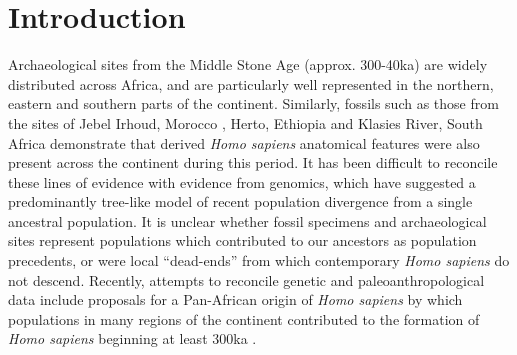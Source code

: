 \documentclass[]{article}
\begin{document}
\section*{Introduction}

Archaeological sites from the Middle Stone Age (approx. 300-40ka) are widely
distributed across Africa, and are particularly well represented in the
northern, eastern and southern parts of the continent. Similarly, fossils 
such as those from the sites of Jebel Irhoud, Morocco \citep{Hublin2017-cq}, Herto, Ethiopia
\citep{White2003-bk} and Klasies River, South Africa \citep{Deacon1995-rx} demonstrate that 
derived \emph{Homo sapiens} anatomical features were also present across the
continent during this period. It has been difficult to reconcile these lines of
evidence with evidence from genomics, which have suggested a predominantly
tree-like model of recent population divergence from a single ancestral
population. It is unclear whether fossil specimens and archaeological sites
represent populations which contributed to our ancestors as population
precedents, or were local ``dead-ends'' from which contemporary \emph{Homo
sapiens} do not descend. 
Recently,
attempts to reconcile genetic and
paleoanthropological data include proposals for a Pan-African origin of
\emph{Homo sapiens} by which populations in many regions of the continent
contributed to the formation of \emph{Homo sapiens} beginning at least 300ka
\citep{Stringer2016-mj,Scerri2018-nl,Scerri2019-xg}.
\end{document}
